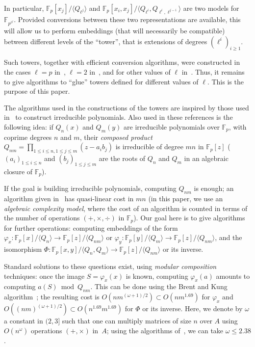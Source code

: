 \documentclass{sig-alternate}
\def\F {\ensuremath{\mathbb{F}}}
\newcounter{algo}
\newcommand{\ang}[1]{\langle#1\rangle}
\begin{document}
In particular, $\F_p[x_j]/\ang{Q_{\ell^j}}$ and
$\F_p[x_i,x_j]/\ang{Q_{\ell^i},Q_{\ell^i,\ell^{j-i}}}$ are two models
for $\F_{p^{\ell^j}}$. Provided conversions between these two
representations are available, this will allow us to perform
embeddings (that will necessarily be compatible) between different
levels of the ``tower'', that is extensions of degrees $(\ell^i)_{i
  \ge 1}$.

Such towers, together with efficient conversion algorithms, were
constructed in the cases $\ell = p$
in~\cite{cantor89,couveignes00,df+schost12}, $\ell=2$
in~\cite{DoSc12}, and for other values of $\ell$ in~\cite{DeDoSc13}.
Thus, it remains to give algorithms to ``glue'' towers defined for
different values of $\ell$. This is the purpose of this paper.

\smallskip{} The algorithms used
in the constructions of the towers are inspired by those used
in~\cite{Shoup90,shoup94,couveignes+lercier11} to construct
irreducible polynomials. Also used in these references is the
following idea: if $Q_n(x)$ and $Q_m(y)$ are irreducible polynomials
over $\F_p$, with coprime degrees $n$ and $m$, their {\em composed
  product} $Q_{nm} = \prod_{1 \le i \le n, 1 \le j \le m} (z- a_i
b_j)$ is irreducible of degree $mn$ in $\F_p[z]$ ($(a_i)_{1 \le
  i \le n}$ and $(b_j)_{1 \le j \le m}$ are the roots of $Q_n$ and
$Q_m$ in an algebraic closure of $\F_p$).

If the goal is building irreducible polynomials, computing $Q_{nm}$ is
enough; an algorithm given in~\cite{BoFlSaSc06} has quasi-linear cost
in $mn$ (in this paper, we use an {\em algebraic complexity model},
where the cost of an algorithm is counted in terms of the number of
operations $(+,\times,\div)$ in $\F_p$). Our goal here is to give
algorithms for further operations: computing embeddings of the form
$\varphi_x: \F_p[x]/\ang{Q_n}\to \F_p[z]/\ang{Q_{nm}}$ or $\varphi_y:
\F_p[y]/\ang{Q_m}\to \F_p[z]/\ang{Q_{nm}}$, and the isomorphism $\Phi:
\F_p[x,y]/\ang{Q_n,Q_m}\to \F_p[z]/\ang{Q_{nm}}$ or its inverse.

Standard solutions to these questions exist, using {\em modular
  composition} techniques: once the image $S=\varphi_x(x)$ is known,
computing $\varphi_x(a)$ amounts to computing $a(S) \bmod Q_{nm}$.
This can be done using the Brent and Kung algorithm~\cite{brent+kung};
the resulting cost is $O(n m^{(\omega+1)/2}) \subset O(n m^{1.69})$
for $\varphi_x$ and $O((n m)^{(\omega+1)/2}) \subset O(n^{1.69}
m^{1.69})$ for $\Phi$ or its inverse. Here, we denote by $\omega$ a
constant in $(2,3]$ such that one can multiply matrices of size $n$
  over $A$ using $O(n^\omega)$ operations $(+,\times)$ in~$A$; using
  the algorithms of~\cite{coppersmith+winograd,Williams12}, we can
  take $\omega \le 2.38$.
\end{document}
